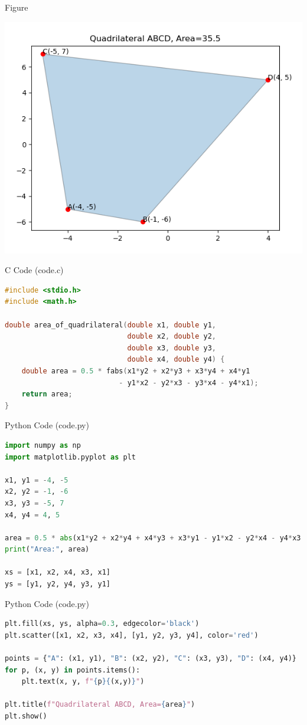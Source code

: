 \documentclass{beamer}
\begin{document}
\begin{frame}{Figure}
\begin{center}
\includegraphics[width=0.6\columnwidth]{figs/fig.png}
\end{center}

\end{frame}
\begin{frame}[fragile]{C Code (code.c)}
\begin{lstlisting}[language=C]
#include <stdio.h>
#include <math.h>

double area_of_quadrilateral(double x1, double y1,
                             double x2, double y2,
                             double x3, double y3,
                             double x4, double y4) {
    double area = 0.5 * fabs(x1*y2 + x2*y3 + x3*y4 + x4*y1
                           - y1*x2 - y2*x3 - y3*x4 - y4*x1);
    return area;
}

\end{lstlisting}
\end{frame}
\begin{frame}[fragile]{Python Code (code.py)}
\begin{lstlisting}[language=Python]
import numpy as np
import matplotlib.pyplot as plt

x1, y1 = -4, -5
x2, y2 = -1, -6
x3, y3 = -5, 7
x4, y4 = 4, 5

area = 0.5 * abs(x1*y2 + x2*y4 + x4*y3 + x3*y1 - y1*x2 - y2*x4 - y4*x3 - y3*x1)
print("Area:", area)

xs = [x1, x2, x4, x3, x1]
ys = [y1, y2, y4, y3, y1]
\end{lstlisting}
\end{frame}
\begin{frame}[fragile]{Python Code (code.py)}
\begin{lstlisting}[language=Python]
plt.fill(xs, ys, alpha=0.3, edgecolor='black')
plt.scatter([x1, x2, x3, x4], [y1, y2, y3, y4], color='red')

points = {"A": (x1, y1), "B": (x2, y2), "C": (x3, y3), "D": (x4, y4)}
for p, (x, y) in points.items():
    plt.text(x, y, f"{p}{(x,y)}")

plt.title(f"Quadrilateral ABCD, Area={area}")
plt.show()
\end{lstlisting}
\end{frame}
\end{document}

